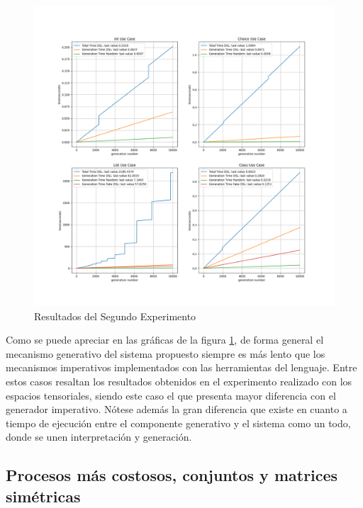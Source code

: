 \begin{figure}[!ht]
      \includegraphics[width=\linewidth]{Graphics/exp2.png}
      \caption{Resultados del Segundo Experimento}
      \label{fig:exp2}
\end{figure}

Como se puede apreciar en las gráficas de la figura \ref{fig:exp2}, de forma general el mecanismo generativo 
del sistema propuesto siempre es más lento que los mecanismos imperativos implementados con las 
herramientas del lenguaje. Entre estos casos resaltan los resultados obtenidos en el experimento 
realizado con los espacios tensoriales, siendo este caso el que presenta mayor diferencia con el 
generador imperativo. Nótese además la gran diferencia que existe en cuanto a tiempo de ejecución 
entre el componente generativo y el sistema como un todo, donde se unen interpretación y generación.

\subsection{Procesos más costosos, conjuntos y matrices simétricas}

